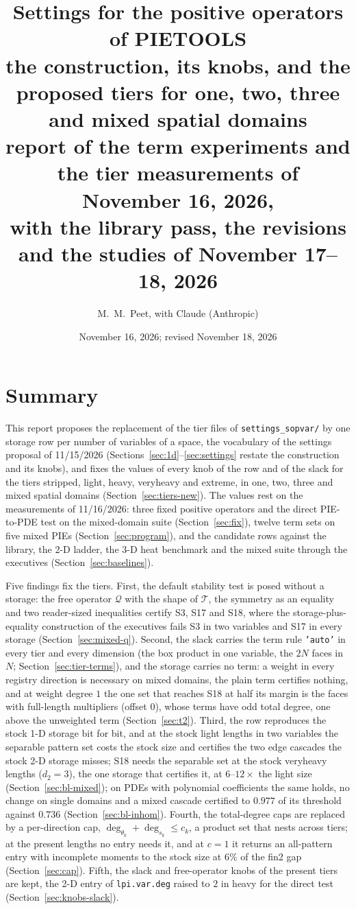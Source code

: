 \documentclass[12pt]{article}
\title{Settings for the positive operators of PIETOOLS \\
\large the construction, its knobs, and the proposed tiers for one, two, three and mixed spatial domains \\
\normalsize report of the term experiments and the tier measurements of November 16, 2026, \\ with the library pass, the revisions and the studies of November 17--18, 2026}
\author{M.~M.~Peet, with Claude (Anthropic)}
\date{November 16, 2026; revised November 18, 2026}
\newcommand{\mcl}[1]{\mathcal{#1}}
\newcommand{\code}[1]{\texttt{#1}}
\theoremstyle{plain}
\theoremstyle{definition}
\theoremstyle{remark}
\begin{document}
\maketitle

\section{Summary}\label{sec:summary}

This report proposes the replacement of the tier files of \code{settings\_sopvar/} by one storage row per number of variables of a space, the vocabulary of the settings proposal of 11/15/2026 (Sections~\ref{sec:1d}--\ref{sec:settings} restate the construction and its knobs), and fixes the values of every knob of the row and of the slack for the tiers stripped, light, heavy, veryheavy and extreme, in one, two, three and mixed spatial domains (Section~\ref{sec:tiers-new}). The values rest on the measurements of 11/16/2026: three fixed positive operators and the direct PIE-to-PDE test on the mixed-domain suite (Section~\ref{sec:fix}), twelve term sets on five mixed PIEs (Section~\ref{sec:program}), and the candidate rows against the library, the 2-D ladder, the 3-D heat benchmark and the mixed suite through the executives (Section~\ref{sec:baselines}).

Five findings fix the tiers. First, the default stability test is posed without a storage: the free operator $\mcl Q$ with the shape of $\mcl T$, the symmetry as an equality and two reader-sized inequalities certify S3, S17 and S18, where the storage-plus-equality construction of the executives fails S3 in two variables and S17 in every storage (Section~\ref{sec:mixed-q}). Second, the slack carries the term rule \code{'auto'} in every tier and every dimension (the box product in one variable, the $2N$ faces in $N$; Section~\ref{sec:tier-terms}), and the storage carries no term: a weight in every registry direction is necessary on mixed domains, the plain term certifies nothing, and at weight degree $1$ the one set that reaches S18 at half its margin is the faces with full-length multipliers (offset $0$), whose terms have odd total degree, one above the unweighted term (Section~\ref{sec:t2}). Third, the row reproduces the stock 1-D storage bit for bit, and at the stock light lengths in two variables the separable pattern set costs the stock size and certifies the two edge cascades the stock 2-D storage misses; S18 needs the separable set at the stock veryheavy lengths ($d_2=3$), the one storage that certifies it, at $6$--$12\times$ the light size (Section~\ref{sec:bl-mixed}); on PDEs with polynomial coefficients the same holds, no change on single domains and a mixed cascade certified to $0.977$ of its threshold against $0.736$ (Section~\ref{sec:bl-inhom}). Fourth, the total-degree caps are replaced by a per-direction cap, $\deg_{\theta_k}+\deg_{s_k}\le c_k$, a product set that nests across tiers; at the present lengths no entry needs it, and at $c=1$ it returns an all-pattern entry with incomplete moments to the stock size at $6\%$ of the fin2 gap (Section~\ref{sec:cap}). Fifth, the slack and free-operator knobs of the present tiers are kept, the 2-D entry of \code{lpi.var.deg} raised to $2$ in heavy for the direct test (Section~\ref{sec:knobs-slack}).
\end{document}
